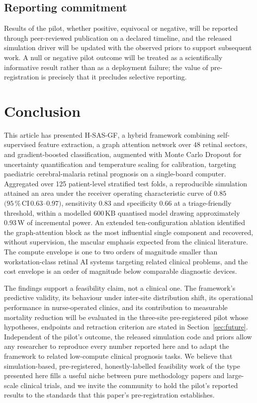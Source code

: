 \documentclass[twocolumn,10pt]{article}
\begin{document}
\subsection{Reporting commitment}
Results of the pilot, whether positive, equivocal or negative,
will be reported through peer-reviewed publication on a declared
timeline, and the released simulation driver will be updated
with the observed priors to support subsequent work. A null or
negative pilot outcome will be treated as a scientifically
informative result rather than as a deployment failure; the
value of pre-registration is precisely that it precludes
selective reporting.

\section{Conclusion}
\label{sec:conclusion}

This article has presented H-SAS-GF, a hybrid framework combining
self-supervised feature extraction, a graph attention network
over 48 retinal sectors, and gradient-boosted classification,
augmented with Monte Carlo Dropout for uncertainty quantification
and temperature scaling for calibration, targeting paediatric
cerebral-malaria retinal prognosis on a single-board computer.
Aggregated over 125 patient-level stratified test folds, a
reproducible simulation attained an area under the receiver
operating characteristic curve of $0.85$
$(95\,\%\,\text{CI}\,0.63$--$0.97)$, sensitivity $0.83$ and
specificity $0.66$ at a triage-friendly threshold, within a
modelled $600$\,KB quantised model drawing approximately
$0.93$\,W of incremental power. An extended
ten-configuration ablation identified the graph-attention block
as the most influential single component and recovered, without
supervision, the macular emphasis expected from the clinical
literature. The compute envelope is one to two orders of
magnitude smaller than workstation-class retinal AI systems
targeting related clinical problems, and the cost envelope is an
order of magnitude below comparable diagnostic devices.

The findings support a feasibility claim, not a clinical one. The
framework's predictive validity, its behaviour under inter-site
distribution shift, its operational performance in nurse-operated
clinics, and its contribution to measurable mortality reduction
will be evaluated in the three-site pre-registered pilot whose
hypotheses, endpoints and retraction criterion are stated in
Section~\ref{sec:future}. Independent of the pilot's outcome, the
released simulation code and priors allow any researcher to
reproduce every number reported here and to adapt the framework
to related low-compute clinical prognosis tasks. We believe that
simulation-based, pre-registered, honestly-labelled feasibility
work of the type presented here fills a useful niche between
pure methodology papers and large-scale clinical trials, and we
invite the community to hold the pilot's reported results to the
standards that this paper's pre-registration establishes.
\end{document}
